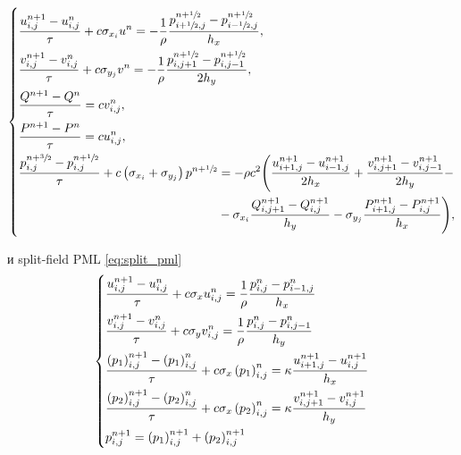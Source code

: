 \begin{equation}
	\begin{dcases}
		\frac{u^{n+1}_{i,j} - u^{n}_{i,j}}{\tau} + c \sigma_{x_{i}} u^{n} = -\frac{1}{\rho}\frac{p^{n+\sfrac{1}{2}}_{i+\sfrac{1}{2},j} - p^{n+\sfrac{1}{2}}_{i-\sfrac{1}{2},j}}{h_x} ,\\
		\frac{v^{n+1}_{i,j} - v^{n}_{i,j}}{\tau} + c \sigma_{y_{j}} v^{n}  = -\frac{1}{\rho}\frac{p^{n+\sfrac{1}{2}}_{i,j+1} - p^{n+\sfrac{1}{2}}_{i,j-1}}{2h_y} ,\\
		\frac{Q^{n+1} - Q^{n}}{\tau} = c v^n_{i,j} ,\\
		\frac{P^{n+1} - P^{n}}{\tau} = c u^n_{i,j} ,\\
	    \begin{aligned}
    	    \dfrac{p^{n+\sfrac{3}{2}}_{i,j} - p^{n+\sfrac{1}{2}}_{i,j}}{\tau} + c \left(\sigma_{x_{i}} + \sigma_{y_{j}}\right)p^{n+\sfrac{1}{2}} &= -\rho c^2 \Bigg(\frac{u^{n+1}_{i+1,j} - u^{n+1}_{i-1,j}}{2h_x} + \dfrac{v^{n+1}_{i,j+1} - v^{n+1}_{i,j-1}}{2h_y} - \\
    	    &-\sigma_{x_i}\frac{Q^{n+1}_{i,j+1} - Q^{n+1}_{i,j}}{h_y} - \sigma_{y_j}\frac{P^{n+1}_{i+1,j} - P^{n+1}_{i,j}}{h_x} \Bigg) ,
	    \end{aligned} 
	\end{dcases}\label{eq:diff_pml}
\end{equation}
    
\noindent и split-field PML \eqref{eq:split_pml}
\begin{equation}
    \begin{dcases}
        \frac{u_{i,j}^{n+1} - u_{i,j}^n}{\tau} + c \sigma_x u_{i,j}^n = \frac{1}{\rho} \frac{p_{i,j}^n - p_{i-1,j}^n}{h_x} \\
        \frac{v_{i,j}^{n+1} - v_{i,j}^n}{\tau} + c \sigma_y v_{i,j}^n = \frac{1}{\rho} \frac{p_{i,j}^n - p_{i,j-1}^n}{h_y} \\
        \frac{\left(p_1\right)_{i,j}^{n+1}-\left(p_1\right)_{i,j}^n}{\tau} + c \sigma_x \left(p_1\right)_{i,j}^n = \kappa \dfrac{u_{i+1,j}^{n+1} - u_{i,j}^{n+1}}{h_x} \\
        \frac{\left(p_2\right)_{i,j}^{n+1}-\left(p_2\right)_{i,j}^n}{\tau} + c \sigma_x \left(p_2\right)_{i,j}^n  = \kappa \dfrac{v_{i,j+1}^{n+1} - v_{i,j}^{n+1}}{h_y}\\
        p_{i,j}^{n+1} = \left(p_1\right)_{i,j}^{n+1} + \left(p_2\right)_{i,j}^{n+1}
    \end{dcases}
    \label{eq:diff_split_pml}
\end{equation}
    
